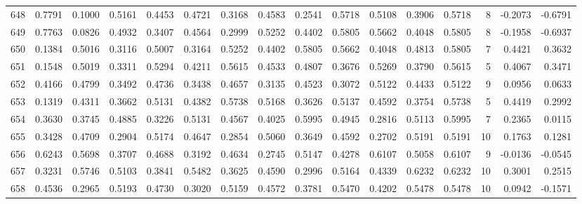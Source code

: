 \begin{tabular}{lrrrrrrrrrrrrrrr}
648 &      0.7791 &  0.1000 &  0.5161 &  0.4453 &  0.4721 &  0.3168 &  0.4583 &  0.2541 &  0.5718 &  0.5108 &   0.3906 &     0.5718 &      8 &                   -0.2073 &                    -0.6791 \\
649 &      0.7763 &  0.0826 &  0.4932 &  0.3407 &  0.4564 &  0.2999 &  0.5252 &  0.4402 &  0.5805 &  0.5662 &   0.4048 &     0.5805 &      8 &                   -0.1958 &                    -0.6937 \\
650 &      0.1384 &  0.5016 &  0.3116 &  0.5007 &  0.3164 &  0.5252 &  0.4402 &  0.5805 &  0.5662 &  0.4048 &   0.4813 &     0.5805 &      7 &                    0.4421 &                     0.3632 \\
651 &      0.1548 &  0.5019 &  0.3311 &  0.5294 &  0.4211 &  0.5615 &  0.4533 &  0.4807 &  0.3676 &  0.5269 &   0.3790 &     0.5615 &      5 &                    0.4067 &                     0.3471 \\
652 &      0.4166 &  0.4799 &  0.3492 &  0.4736 &  0.3438 &  0.4657 &  0.3135 &  0.4523 &  0.3072 &  0.5122 &   0.4433 &     0.5122 &      9 &                    0.0956 &                     0.0633 \\
653 &      0.1319 &  0.4311 &  0.3662 &  0.5131 &  0.4382 &  0.5738 &  0.5168 &  0.3626 &  0.5137 &  0.4592 &   0.3754 &     0.5738 &      5 &                    0.4419 &                     0.2992 \\
654 &      0.3630 &  0.3745 &  0.4885 &  0.3226 &  0.5131 &  0.4567 &  0.4025 &  0.5995 &  0.4945 &  0.2816 &   0.5113 &     0.5995 &      7 &                    0.2365 &                     0.0115 \\
655 &      0.3428 &  0.4709 &  0.2904 &  0.5174 &  0.4647 &  0.2854 &  0.5060 &  0.3649 &  0.4592 &  0.2702 &   0.5191 &     0.5191 &     10 &                    0.1763 &                     0.1281 \\
656 &      0.6243 &  0.5698 &  0.3707 &  0.4688 &  0.3192 &  0.4634 &  0.2745 &  0.5147 &  0.4278 &  0.6107 &   0.5058 &     0.6107 &      9 &                   -0.0136 &                    -0.0545 \\
657 &      0.3231 &  0.5746 &  0.5103 &  0.3841 &  0.5482 &  0.3625 &  0.4590 &  0.2996 &  0.5164 &  0.4339 &   0.6232 &     0.6232 &     10 &                    0.3001 &                     0.2515 \\
658 &      0.4536 &  0.2965 &  0.5193 &  0.4730 &  0.3020 &  0.5159 &  0.4572 &  0.3781 &  0.5470 &  0.4202 &   0.5478 &     0.5478 &     10 &                    0.0942 &                    -0.1571 \\

\end{tabular}

